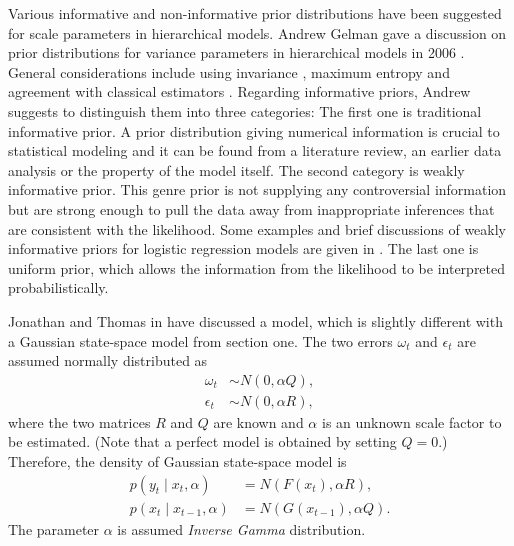 Various informative and non-informative prior distributions have been suggested for scale parameters in hierarchical models. Andrew Gelman gave a discussion on prior distributions for variance parameters in hierarchical models in 2006 \cite{gelman2006prior}. General considerations include using invariance \cite{jeffries1961theory}, maximum entropy \cite{jaynes1983papers} and agreement with classical estimators \cite{box2011bayesian}.  Regarding informative priors, Andrew suggests to distinguish them into three categories: The first one is traditional informative prior. A prior distribution giving numerical information is crucial to statistical modeling and it can be found from a literature review, an earlier data analysis or the property of the model itself. The second category is weakly informative prior. This genre prior is  not supplying any controversial information but are strong enough to pull the data away from inappropriate inferences that are consistent with the likelihood. Some examples and brief discussions of weakly informative priors for logistic regression models are given in \cite{gelman2008weakly}. The last one is uniform prior, which allows the information from the likelihood to be interpreted probabilistically. 

Jonathan and Thomas in \cite{stroud2007sequential} have discussed a model, which is slightly different with a Gaussian state-space model from section one. The two errors $\omega_t$ and $\epsilon_t$ are assumed normally distributed as
\begin{align*}
\omega_t &\sim N(0,\alpha Q),\\
\epsilon_t &\sim N(0,\alpha R),
\end{align*}
where the two matrices $R$ and $Q$ are known and $\alpha$ is an unknown scale factor to be estimated. (Note that a perfect model is obtained by setting $Q= 0$.) Therefore, the density of Gaussian state-space model is
\begin{align*}
p(y_t\mid x_t,\alpha) &= N(F(x_t),\alpha R),\\
p(x_t\mid x_{t-1},\alpha) &= N(G(x_{t-1}),\alpha Q).
\end{align*}
The parameter $\alpha$ is assumed \textit{Inverse Gamma} distribution. 

